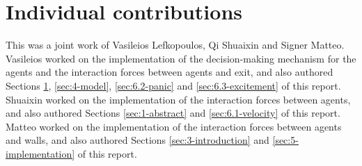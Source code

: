 \section{Individual contributions} \label{sec:2-contributions}
This was a joint work of Vasileios Lefkopoulos, Qi Shuaixin and Signer Matteo. Vasileios worked on the implementation of the decision-making mechanism for the agents and the interaction forces between agents and exit, and also authored Sections \ref{sec:2-contributions}, \ref{sec:4-model}, \ref{sec:6.2-panic} and \ref{sec:6.3-excitement} of this report. Shuaixin worked on the implementation of the interaction forces between agents, and also authored Sections \ref{sec:1-abstract} and \ref{sec:6.1-velocity} of this report. Matteo worked on the implementation of the interaction forces between agents and walls, and also authored Sections \ref{sec:3-introduction} and \ref{sec:5-implementation} of this report.